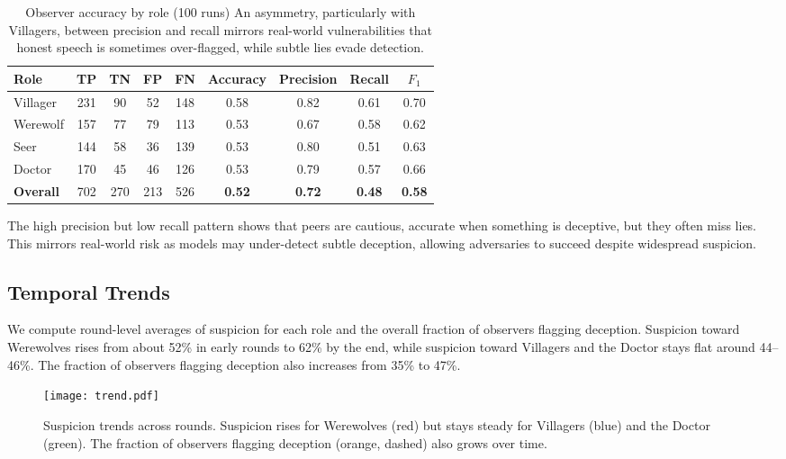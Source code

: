 \documentclass{article}
\begin{document}
\begin{table}[h]
\centering
\caption{Observer accuracy by role (100 runs) An asymmetry, particularly with Villagers, between precision and recall mirrors real-world vulnerabilities that honest speech is sometimes over-flagged, while subtle lies evade detection.}
\label{tab:observer_accuracy}
\begin{tabular}{lcccccccc}
\toprule
\textbf{Role} & TP & TN & FP & FN & Accuracy & Precision & Recall & $F_1$ \\
\midrule
Villager & 231 & 90 & 52 & 148 & 0.58 & 0.82 & 0.61 & 0.70 \\
Werewolf & 157 & 77 & 79 & 113 & 0.53 & 0.67 & 0.58 & 0.62 \\
Seer     & 144 & 58 & 36 & 139 & 0.53 & 0.80 & 0.51 & 0.63 \\
Doctor   & 170 & 45 & 46 & 126 & 0.53 & 0.79 & 0.57 & 0.66 \\
\midrule
\textbf{Overall} & 702 & 270 & 213 & 526 & \textbf{0.52} & \textbf{0.72} & \textbf{0.48} & \textbf{0.58} \\
\bottomrule
\end{tabular}
\end{table}

The high precision but low recall pattern shows that peers are cautious, accurate when something is deceptive, but they often miss lies. This mirrors real-world risk as models may under-detect subtle deception, allowing adversaries to succeed despite widespread suspicion.

\subsection{Temporal Trends}
We compute round-level averages of suspicion for each role and the overall fraction of observers flagging deception. Suspicion toward Werewolves rises from about 52\% in early rounds to 62\% by the end, while suspicion toward Villagers and the Doctor stays flat around 44--46\%. The fraction of observers flagging deception also increases from 35\% to 47\%.  

\begin{figure}[h]
    \centering
    \texttt{[image: trend.pdf]}
    \caption{Suspicion trends across rounds. 
    Suspicion rises for Werewolves (red) but stays steady for Villagers (blue) and the Doctor (green). 
    The fraction of observers flagging deception (orange, dashed) also grows over time.}
    \label{fig:temporal_trends}
\end{figure}
\end{document}
